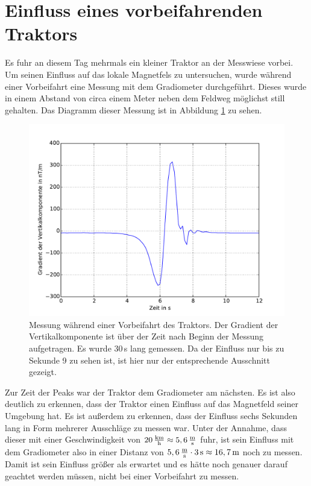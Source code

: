 \section{Einfluss eines vorbeifahrenden Traktors}

Es fuhr an diesem Tag mehrmals ein kleiner Traktor an der Messwiese vorbei. Um seinen Einfluss auf das lokale Magnetfels zu untersuchen, wurde während einer Vorbeifahrt eine Messung mit dem Gradiometer durchgeführt. Dieses wurde in einem Abstand von circa einem Meter neben dem Feldweg möglichst still gehalten. Das Diagramm dieser Messung ist in Abbildung \ref{fig:plot_traktor} zu sehen.

\begin{figure}[!ht]
 \centering
 \includegraphics[width=\textwidth]{fig/traktor_ausschnitt.pdf}
 \caption[Messung während einer Vorbeifahrt des Traktors]{Messung während einer Vorbeifahrt des Traktors. Der Gradient der Vertikalkomponente ist über der Zeit nach Beginn der Messung aufgetragen. Es wurde 30\,s lang gemessen. Da der Einfluss nur bis zu Sekunde 9 zu sehen ist, ist hier nur der entsprechende Ausschnitt gezeigt.}
 \label{fig:plot_traktor}
\end{figure}

Zur Zeit der Peaks war der Traktor dem Gradiometer am nächsten. Es ist also deutlich zu erkennen, dass der Traktor einen Einfluss auf das Magnetfeld seiner Umgebung hat. Es ist außerdem zu erkennen, dass der Einfluss sechs Sekunden lang in Form mehrerer Ausschläge zu messen war. Unter der Annahme, dass dieser mit einer Geschwindigkeit von $20\,\frac{\mathrm{km}}{\mathrm{h}}\approx5,6\,\frac{\mathrm{m}}{\mathrm{s}}$ fuhr, ist sein Einfluss mit dem Gradiometer also in einer Distanz von $5,6\,\frac{\mathrm{m}}{\mathrm{s}}\cdot3\,\mathrm{s}\approx16,7\,\mathrm{m}$ noch zu messen. Damit ist sein Einfluss größer als erwartet und es hätte noch genauer darauf geachtet werden müssen, nicht bei einer Vorbeifahrt zu messen.